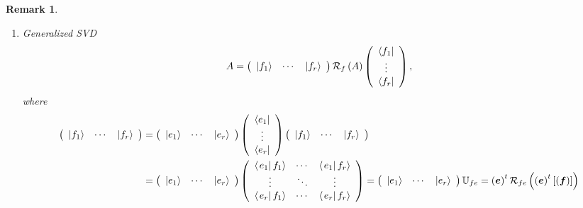 \documentclass[aps,preprint]{revtex4}%
\newtheorem{remark}[theorem]{Remark}
\begin{document}
\begin{remark}
\begin{enumerate}
\begin{enumerate}
\begin{enumerate}
\item Generalized SVD
\begin{equation}
A=\left(
\begin{array}
[c]{ccc}%
\left\vert f_{1}\right\rangle  & \cdots & \left\vert f_{r}\right\rangle
\end{array}
\right)  \mathcal{R}_{f}\left(  A\right)  \left(
\begin{array}
[c]{c}%
\left\langle f_{1}\right\vert \\
\vdots\\
\left\langle f_{r}\right\vert
\end{array}
\right)  ,
\end{equation}
where
\begin{align}
\left(
\begin{array}
[c]{ccc}%
\left\vert f_{1}\right\rangle  & \cdots & \left\vert f_{r}\right\rangle
\end{array}
\right)   &  =\left(
\begin{array}
[c]{ccc}%
\left\vert e_{1}\right\rangle  & \cdots & \left\vert e_{r}\right\rangle
\end{array}
\right)  \left(
\begin{array}
[c]{c}%
\left\langle e_{1}\right\vert \\
\vdots\\
\left\langle e_{r}\right\vert
\end{array}
\right)  \left(
\begin{array}
[c]{ccc}%
\left\vert f_{1}\right\rangle  & \cdots & \left\vert f_{r}\right\rangle
\end{array}
\right) \\
&  =\left(
\begin{array}
[c]{ccc}%
\left\vert e_{1}\right\rangle  & \cdots & \left\vert e_{r}\right\rangle
\end{array}
\right)  \left(
\begin{array}
[c]{ccc}%
\left\langle \left.  e_{1}\right\vert f_{1}\right\rangle  & \cdots &
\left\langle \left.  e_{1}\right\vert f_{r}\right\rangle \\
\vdots & \ddots & \vdots\\
\left\langle \left.  e_{r}\right\vert f_{1}\right\rangle  & \cdots &
\left\langle \left.  e_{r}\right\vert f_{r}\right\rangle
\end{array}
\right)  =\left(
\begin{array}
[c]{ccc}%
\left\vert e_{1}\right\rangle  & \cdots & \left\vert e_{r}\right\rangle
\end{array}
\right)  \mathbb{U}_{fe}=\left(  \boldsymbol{e}\right)  ^{t}\mathcal{R}%
_{fe}\left(  \overset{}{\left(  \boldsymbol{e}\right)  ^{t}\left[  \left(
\boldsymbol{f}\right)  \right]  }\right)
\end{align}


\end{enumerate}
\end{enumerate}
\end{enumerate}
\end{remark}
\end{document}
